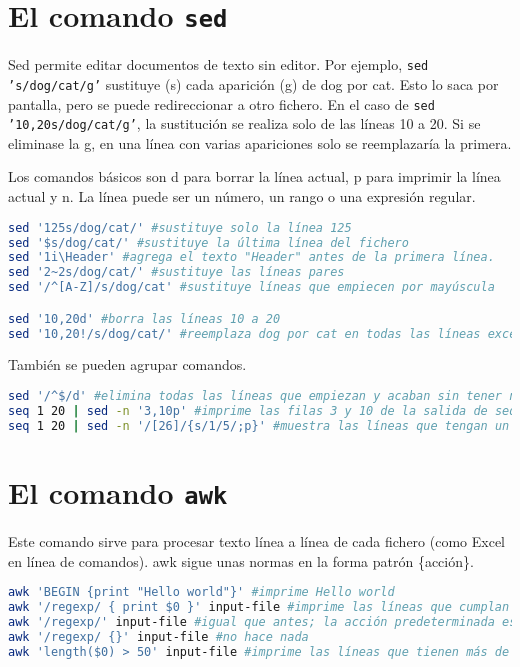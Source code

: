 \section{El comando \texttt{sed}}
Sed permite editar documentos de texto sin editor. Por ejemplo, \texttt{sed 's/dog/cat/g'} sustituye (s) cada aparición (g) de dog por cat. Esto lo saca por pantalla, pero se puede redireccionar a otro fichero. En el caso de \texttt{sed '10,20s/dog/cat/g'}, la sustitución se realiza solo de las líneas 10 a 20. Si se eliminase la g, en una línea con varias apariciones solo se reemplazaría la primera.

Los comandos básicos son d para borrar la línea actual, p para imprimir la línea actual y n. La línea puede ser un número, un rango o una expresión regular.
\begin{lstlisting}[language=bash]
sed '125s/dog/cat/' #sustituye solo la línea 125
sed '$s/dog/cat/' #sustituye la última línea del fichero
sed '1i\Header' #agrega el texto "Header" antes de la primera línea.
sed '2~2s/dog/cat/' #sustituye las líneas pares
sed '/^[A-Z]/s/dog/cat' #sustituye líneas que empiecen por mayúscula

sed '10,20d' #borra las líneas 10 a 20
sed '10,20!/s/dog/cat/' #reemplaza dog por cat en todas las líneas excepto de la 10 a la 20
\end{lstlisting}

También se pueden agrupar comandos.
\begin{lstlisting}[language=bash]
sed '/^$/d' #elimina todas las líneas que empiezan y acaban sin tener nada entre medias, es decir, las líneas en blanco
seq 1 20 | sed -n '3,10p' #imprime las filas 3 y 10 de la salida de seq
seq 1 20 | sed -n '/[26]/{s/1/5/;p}' #muestra las líneas que tengan un 2 o un 6, sustituyendo en ellas el 1 por el 5
\end{lstlisting}

\section{El comando \texttt{awk}}
Este comando sirve para procesar texto línea a línea de cada fichero (como Excel en línea de comandos). awk sigue unas normas en la forma patrón \{acción\}. 
\begin{lstlisting}[language=bash]
awk 'BEGIN {print "Hello world"}' #imprime Hello world
awk '/regexp/ { print $0 }' input-file #imprime las líneas que cumplan la expresión regular
awk '/regexp/' input-file #igual que antes; la acción predeterminada es la impresión
awk '/regexp/ {}' input-file #no hace nada
awk 'length($0) > 50' input-file #imprime las líneas que tienen más de 50 caracteres
\end{lstlisting}


